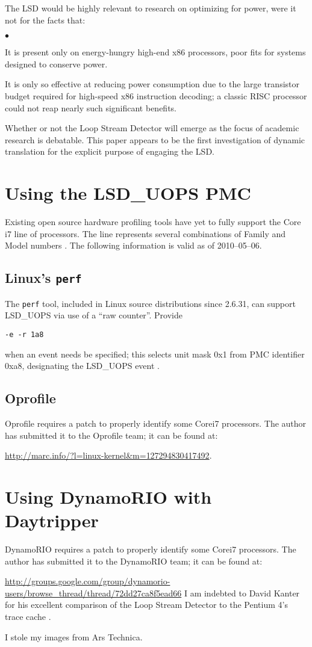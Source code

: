\documentclass[]{sigplanconf}
\newcommand{\squishlist}{\begin{list}{$\bullet$}
  {\setlength{\itemsep}{0pt}
    \setlength{\parsep}{3pt}
    \setlength{\topsep}{3pt}
    \setlength{\partopsep}{0pt}
    \setlength{\leftmargin}{1.5em}
    \setlength{\labelwidth}{1em}
    \setlength{\labelsep}{0.5em}}}
\newcommand{\squishend}{\end{list}}
\begin{document}
The LSD would be highly relevant to research on optimizing for power, were it
not for the facts that:
\squishlist
\item It is present only on energy-hungry high-end x86 processors, poor fits for
systems designed to conserve power.
\item It is only so effective at reducing power consumption due to the large
transistor budget required for high-speed x86 instruction decoding; a classic
RISC processor could not reap nearly such significant benefits.
\squishend
Whether or not the Loop Stream Detector will emerge as the focus of academic
research is debatable. This paper appears to be the first investigation
of dynamic translation for the explicit purpose of engaging the LSD.
\appendix
\section{Using the LSD\_UOPS PMC}

Existing open source hardware profiling tools have yet to fully support the Core\texttrademark
i7 line of processors. The line represents several combinations of Family and
Model numbers \cite{intelcpuid}. The following information is valid
as of 2010--05--06.
\subsection{Linux's \texttt{perf}}
The \texttt{perf} tool, included in Linux source distributions since 2.6.31,
can support LSD\_UOPS via use of a ``raw counter''. Provide

\vspace{5mm}
\texttt{-e -r 1a8}
\vspace{5mm}

when an event needs be specified; this selects unit mask 0x1 from PMC identifier
0xa8, designating the LSD\_UOPS event \cite{intelsys}.
\subsection{Oprofile}
Oprofile requires a patch to properly identify some Core\texttrademark i7
processors. The author has submitted it to the Oprofile team; it can be found
at:

\url{http://marc.info/?l=linux-kernel&m=127294830417492}.
\section{Using DynamoRIO with Daytripper}
DynamoRIO requires a patch to properly identify some Core\texttrademark i7
processors. The author has submitted it to the DynamoRIO team; it can be found
at:

\url{http://groups.google.com/group/dynamorio-users/browse_thread/thread/72dd27ca8f5ead66}
\acks
I am indebted to David Kanter for his excellent comparison of the Loop Stream
Detector to the Pentium 4's trace cache \cite{kanter}.

I stole my images from Ars Technica.



\end{document}
